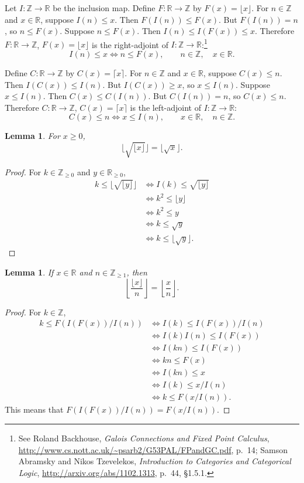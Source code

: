 \documentclass{article}
\newtheorem{lemma}[theorem]{Lemma}
\theoremstyle{definition}
\begin{document}
Let $I:\mathbb{Z} \to \mathbb{R}$ be the inclusion map. 
Define $F:\mathbb{R} \to \mathbb{Z}$ by $F(x)=\lfloor x \rfloor$.
For $n \in \mathbb{Z}$ and $x \in \mathbb{R}$,
suppose $I(n) \leq x$. Then $F(I(n)) \leq F(x)$. But $F(I(n)) = n$, so
$n \leq F(x)$. Suppose $n \leq F(x)$. Then $I(n) \leq I(F(x)) \leq x$. 
Therefore $F:\mathbb{R} \to \mathbb{Z}$, $F(x) =\lfloor x \rfloor$ is the right-adjoint of $I:\mathbb{Z} \to \mathbb{R}$:\footnote{See
Roland Backhouse, {\em Galois Connections and Fixed Point Calculus},
\url{http://www.cs.nott.ac.uk/~psarb2/G53PAL/FPandGC.pdf}, p.~14;
Samson Abramsky and Nikos Tzevelekos, {\em Introduction to Categories and Categorical Logic},
\url{http://arxiv.org/abs/1102.1313},
p.~44, \S 1.5.1.}
\[
I(n) \leq x \iff n \leq F(x),\qquad  n \in \mathbb{Z},\quad x \in \mathbb{R}.
\]


Define $C:\mathbb{R} \to \mathbb{Z}$ by  $C(x)=\lceil x \rceil$.
For $n \in \mathbb{Z}$ and $x \in \mathbb{R}$,
suppose $C(x) \leq n$. Then $I(C(x)) \leq I(n)$. But $I(C(x)) \geq x$, so
$x \leq I(n)$. Suppose $x \leq I(n)$. Then
$C(x) \leq C(I(n))$. But 
$C(I(n))=n$, so
$C(x) \leq n$. Therefore 
$C:\mathbb{R} \to \mathbb{Z}$, $C(x) = \lceil x \rceil$ is the left-adjoint of $I:\mathbb{Z} \to \mathbb{R}$:
\[
C(x) \leq n \iff x \leq I(n),\qquad x \in \mathbb{R},\quad n \in \mathbb{Z}.
\]


\begin{lemma}
For $x \geq 0$,
\[
\lfloor \sqrt{\lfloor x \rfloor} \rfloor = \lfloor \sqrt{x} \rfloor.
\]
\end{lemma}
\begin{proof}
For $k \in \mathbb{Z}_{\geq 0}$ and $y \in \mathbb{R}_{\geq 0}$,
\begin{align*}
k \leq \lfloor \sqrt{\lfloor y \rfloor} \rfloor&\iff I(k) \leq \sqrt{\lfloor y \rfloor}\\
&\iff k^2 \leq \lfloor y \rfloor\\
&\iff k^2 \leq y\\
&\iff k \leq \sqrt{y}\\
&\iff k \leq \lfloor \sqrt{y} \rfloor.
\end{align*}
\end{proof}


\begin{lemma}
If $x \in \mathbb{R}$ and $n \in \mathbb{Z}_{\geq 1}$, then
\[
\left\lfloor \frac{\lfloor x \rfloor}{n} \right\rfloor = \left\lfloor \frac{x}{n} \right\rfloor.
\]
\end{lemma}
\begin{proof}
For $k \in \mathbb{Z}$,
\begin{align*}
k\leq F(I(F(x))/I(n))&\iff I(k) \leq I(F(x))/I(n)\\
&\iff I(k) I(n) \leq I(F(x))\\
&\iff I(kn) \leq I(F(x))\\
&\iff kn \leq F(x)\\
&\iff I(kn) \leq x\\
&\iff I(k) \leq x/I(n)\\
&\iff k \leq F(x/I(n)).
\end{align*}
This means that $F(I(F(x))/I(n)) = F(x/I(n))$.
\end{proof}
\end{document}

